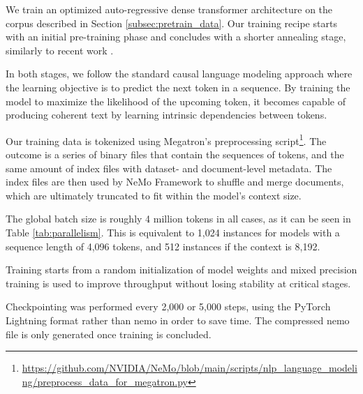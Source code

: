 

We train an optimized auto-regressive dense transformer architecture on the corpus described in Section \ref{subsec:pretrain_data}. Our training recipe starts with an initial pre-training phase and concludes with a shorter annealing stage, similarly to recent work \cite{nemotron4, llama3, eurollm}. 

In both stages, we follow the standard causal language modeling approach \cite{gpt1} where the learning objective is to predict the next token in a sequence. By training the model to maximize the likelihood of the upcoming token, it becomes capable of producing coherent text by learning intrinsic dependencies between tokens.

Our training data is tokenized using Megatron’s preprocessing script\footnote{\url{https://github.com/NVIDIA/NeMo/blob/main/scripts/nlp\_language\_modeling/preprocess\_data\_for\_megatron.py}}. The outcome is a series of binary files that contain the sequences of tokens, and the same amount of index files with dataset- and document-level metadata. The index files are then used by NeMo Framework to shuffle and merge documents, which are ultimately truncated to fit within the model's context size. 

The global batch size is roughly 4 million tokens in all cases, as it can be seen in Table \ref{tab:parallelism}. This is equivalent to 1,024 instances for models with a sequence length of 4,096 tokens, and 512 instances if the context is 8,192.

Training starts from a random initialization of model weights and mixed precision training \cite{mixed_precision} is used to improve throughput without losing stability at critical stages.

Checkpointing was performed every 2,000 or 5,000 steps, using the PyTorch Lightning format rather than nemo in order to save time. The compressed nemo file is only generated once training is concluded. 

